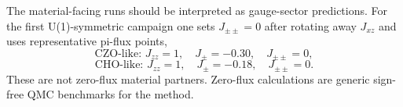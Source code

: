 \documentclass[11pt,letterpaper]{article}
\newcommand{\Jzz}{J_{zz}}
\newcommand{\Jpm}{J_{\pm}}
\theoremstyle{plain}
\theoremstyle{definition}
\begin{document}
The material-facing runs should be interpreted as gauge-sector predictions.
For the first U(1)-symmetric campaign one sets $J_{\pm\pm}=0$ after rotating
away $J_{xz}$ and uses representative pi-flux points,
\[
\text{CZO-like: } \Jzz=1,\quad \Jpm=-0.30,\quad J_{\pm\pm}=0,
\]
\[
\text{CHO-like: } \Jzz=1,\quad \Jpm=-0.18,\quad J_{\pm\pm}=0.
\]
These are not zero-flux material partners.  Zero-flux calculations are generic
sign-free QMC benchmarks for the method.
\end{document}
